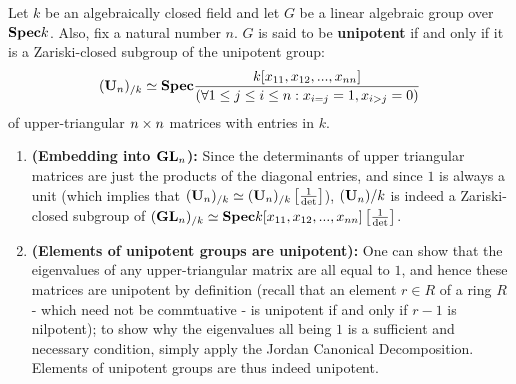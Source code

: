                     \begin{definition} \label{def: unipotent_groups}
                        Let $k$ be an algebraically closed field and let $G$ be a linear algebraic group over $\mathbf{Spec} k$. Also, fix a natural number $n$. $G$ is said to be \textbf{unipotent} if and only if it is a Zariski-closed subgroup of the unipotent group:
                            $$(\mathbf{U}_n)_{/k} \simeq \mathbf{Spec} \frac{k[x_{11}, x_{12}, ..., x_{nn}]}{(\forall 1 \leq j \leq i \leq n: x_{i = j} = 1, x_{i > j} = 0)}$$
                        of upper-triangular $n \x n$ matrices with entries in $k$.
                    \end{definition}
                    \begin{remark} \label{remark: unipotent_groups_are_linear_algebraic_groups}
                        \noindent
                        \begin{enumerate}
                            \item \textbf{(Embedding into $\mathbf{GL}_n$):} Since the determinants of upper triangular matrices are just the products of the diagonal entries, and since $1$ is always a unit (which implies that $(\mathbf{U}_n)_{/k} \simeq (\mathbf{U}_n)_{/k}\left[\frac{1}{\det}\right]$), $(\mathbf{U}_n){/k}$ is indeed a Zariski-closed subgroup of $(\mathbf{GL}_n)_{/k} \simeq \mathbf{Spec} k[x_{11}, x_{12}, ..., x_{nn}]\left[\frac{1}{\det}\right]$. 
                            \item \textbf{(Elements of unipotent groups are unipotent):} One can show that the eigenvalues of any upper-triangular matrix are all equal to $1$, and hence these matrices are unipotent by definition (recall that an element $r \in R$ of a ring $R$ - which need not be commtuative - is unipotent if and only if $r - 1$ is nilpotent); to show why the eigenvalues all being $1$ is a sufficient and necessary condition, simply apply the Jordan Canonical Decomposition. Elements of unipotent groups are thus indeed unipotent.
                        \end{enumerate}
                    \end{remark}
